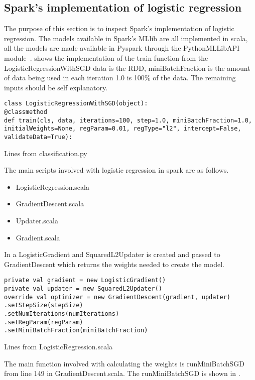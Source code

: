 \subsection{Spark's implementation of logistic regression}\label{sec:sparklogreg}
The purpose of this section is to inspect Spark’s implementation of logistic regression.
The models available in Spark's MLlib are all implemented in scala, all the models are made available in Pyspark through the PythonMLLibAPI module~\cite{hadoopIntro}.
 shows the implementation of the train function from the LogisticRegressionWithSGD data is the RDD, miniBatchFraction is the amount of data being used in each iteration 1.0 is 100\% of the data. The remaining inputs should be self explanatory.   
\begin{listing}[H]
\begin{verbatim}
class LogisticRegressionWithSGD(object):
@classmethod
def train(cls, data, iterations=100, step=1.0, miniBatchFraction=1.0,
initialWeights=None, regParam=0.01, regType="l2", intercept=False,
validateData=True):
\end{verbatim}
\caption{Lines from classification.py}
\label{lst:py_logreg}
\end{listing}
The main scripts involved with logistic regression in spark are as follows.
\begin{itemize}
\item LogisticRegression.scala
\item GradientDescent.scala
\item Updater.scala
\item Gradient.scala
\end{itemize}
In  a LogisticGradient and SquaredL2Updater is created and passed to GradientDescent which returns the weights needed to create the model.
\begin{listing}[H]
\begin{verbatim}
private val gradient = new LogisticGradient()
private val updater = new SquaredL2Updater()
override val optimizer = new GradientDescent(gradient, updater)
.setStepSize(stepSize)
.setNumIterations(numIterations)
.setRegParam(regParam)
.setMiniBatchFraction(miniBatchFraction)
\end{verbatim}
\caption{Lines from LogisticRegression.scala}
\label{lst:gd_logreg}
\end{listing}

The main function involved with calculating the weights is runMiniBatchSGD from line 149 in GradientDescent.scala. The runMiniBatchSGD is shown in . 

